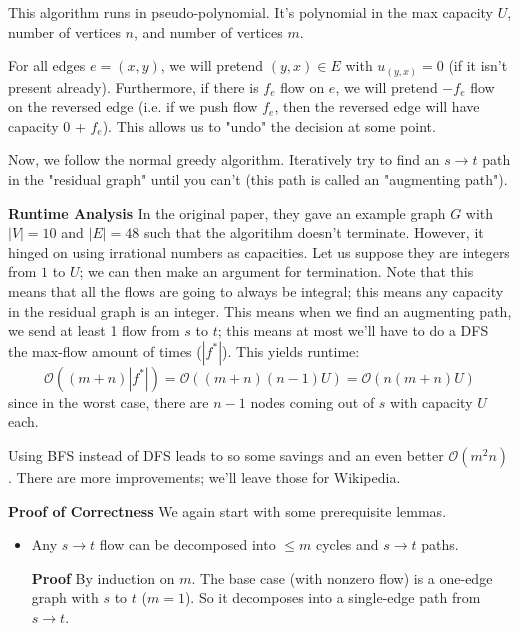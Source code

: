 \begin{algothm}
    This algorithm runs in pseudo-polynomial. It's polynomial in the max capacity $U$, number of vertices $n$, and number of vertices $m$.

    For all edges $e = (x, y)$, we will pretend $(y, x) \in E$ with $u_{(y, x)} = 0$ (if it isn't present already).
    Furthermore, if there is $f_e$ flow on $e$, we will pretend $-f_e$ flow on the reversed edge (i.e. if we push flow $f_e$, then
    the reversed edge will have capacity 0 + $f_e$). This allows us to "undo" the decision at some point.

    Now, we follow the normal greedy algorithm. Iteratively try to find an $s \to t$ path in the "residual graph" until you can't (this path is called
    an "augmenting path").

    \textbf{Runtime Analysis} In the original paper, they gave an example graph $G$ with $|V| = 10$ and $|E| = 48$ such that the algoritihm
    doesn't terminate. However, it hinged on using irrational numbers as capacities. Let us suppose they are integers from $1$ to $U$;
    we can then make an argument for termination. Note that this means that all the flows are going to always be integral; this means
    any capacity in the residual graph is an integer. This means when we find an augmenting path, we send at least 1 flow from $s$ to $t$;
    this means at most we'll have to do a DFS the max-flow amount of times ($|f^*|$). This yields runtime:
    \[\mathcal{O}((m + n) |f^*|) = \mathcal{O}((m + n)(n - 1)U) = \mathcal{O}(n(m + n)U) \]
    since in the worst case, there are $n - 1$ nodes coming out of $s$ with capacity $U$ each.

    Using BFS instead of DFS leads to so some savings and an even better $\mathcal{O}(m^2n)$. There are more improvements;
    we'll leave those for Wikipedia.

    \textbf{Proof of Correctness} We again start with some prerequisite lemmas.
    \begin{itemize}
        \item Any $s \to t$ flow can be decomposed into $\leq m$ cycles and $s \to t$ paths.
        
        \textbf{Proof} By induction on $m$. The base case (with nonzero flow) is a one-edge graph with $s$ to $t$ ($m = 1$). So it decomposes into a single-edge path from $s \to t$.


\end{itemize}
\end{algothm}

